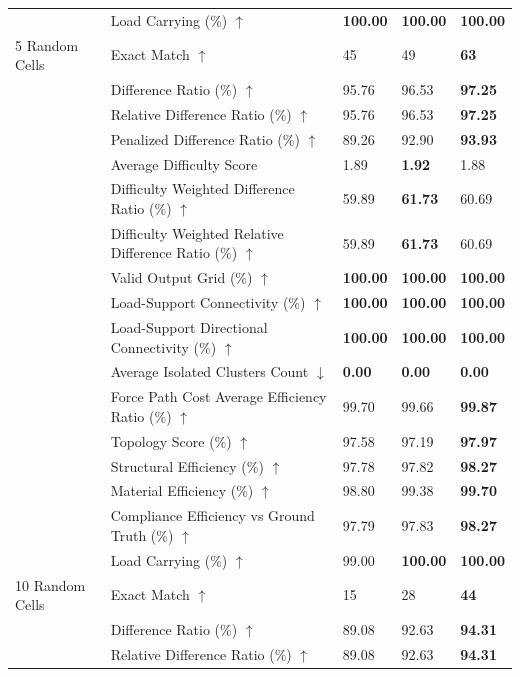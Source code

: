 \begin{table}[!h]
{\begin{tabular}{lllll}
 & Load Carrying (\%) $\uparrow$ & \textbf{100.00} & \textbf{100.00} & \textbf{100.00} \\
5 Random Cells & Exact Match $\uparrow$ & 45 & 49 & \textbf{63} \\
 & Difference Ratio (\%) $\uparrow$ & 95.76 & 96.53 & \textbf{97.25} \\
 & Relative Difference Ratio (\%) $\uparrow$ & 95.76 & 96.53 & \textbf{97.25} \\
 & Penalized Difference Ratio (\%) $\uparrow$ & 89.26 & 92.90 & \textbf{93.93} \\
 & Average Difficulty Score & 1.89 & \textbf{1.92} & 1.88 \\
 & Difficulty Weighted Difference Ratio (\%) $\uparrow$ & 59.89 & \textbf{61.73} & 60.69 \\
 & Difficulty Weighted Relative Difference Ratio (\%) $\uparrow$ & 59.89 & \textbf{61.73} & 60.69 \\
 & Valid Output Grid (\%) $\uparrow$ & \textbf{100.00} & \textbf{100.00} & \textbf{100.00} \\
 & Load-Support Connectivity (\%) $\uparrow$ & \textbf{100.00} & \textbf{100.00} & \textbf{100.00} \\
 & Load-Support Directional Connectivity (\%) $\uparrow$ & \textbf{100.00} & \textbf{100.00} & \textbf{100.00} \\
 & Average Isolated Clusters Count $\downarrow$ & \textbf{0.00} & \textbf{0.00} & \textbf{0.00} \\
 & Force Path Cost Average Efficiency Ratio (\%) $\uparrow$ & 99.70 & 99.66 & \textbf{99.87} \\
 & Topology Score (\%) $\uparrow$ & 97.58 & 97.19 & \textbf{97.97} \\
 & Structural Efficiency (\%) $\uparrow$ & 97.78 & 97.82 & \textbf{98.27} \\
 & Material Efficiency (\%) $\uparrow$ & 98.80 & 99.38 & \textbf{99.70} \\
 & Compliance Efficiency vs Ground Truth (\%) $\uparrow$ & 97.79 & 97.83 & \textbf{98.27} \\
 & Load Carrying (\%) $\uparrow$ & 99.00 & \textbf{100.00} & \textbf{100.00} \\
10 Random Cells & Exact Match $\uparrow$ & 15 & 28 & \textbf{44} \\
 & Difference Ratio (\%) $\uparrow$ & 89.08 & 92.63 & \textbf{94.31} \\
 & Relative Difference Ratio (\%) $\uparrow$ & 89.08 & 92.63 & \textbf{94.31} \\

\end{tabular}}
\end{table}
